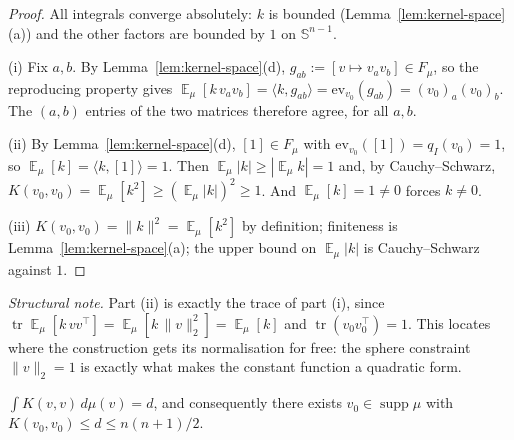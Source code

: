 \documentclass{aicr-solution}
\newcommand{\Expect}{\operatorname*{\mathbb{E}}}
\newcommand{\Sph}{\mathbb{S}^{n-1}}
\newcommand{\supp}{\operatorname{supp}}
\newcommand{\ev}{\mathrm{ev}}
\begin{document}
\begin{proof}
All integrals converge absolutely: $k$ is bounded
(Lemma~\ref{lem:kernel-space}(a)) and the other factors are bounded by
$1$ on $\Sph$.

(i) Fix $a,b$. By Lemma~\ref{lem:kernel-space}(d), $g_{ab} := [v \mapsto
v_{a}v_{b}] \in F_{\mu}$, so the reproducing property gives
$\Expect_{\mu}[k\,v_{a}v_{b}] = \langle k, g_{ab}\rangle =
\ev_{v_{0}}(g_{ab}) = (v_{0})_{a}(v_{0})_{b}$. The $(a,b)$ entries of
the two matrices therefore agree, for all $a,b$.

(ii) By Lemma~\ref{lem:kernel-space}(d), $[1] \in F_{\mu}$ with
$\ev_{v_{0}}([1]) = q_{I}(v_{0}) = 1$, so $\Expect_{\mu}[k] = \langle
k,[1]\rangle = 1$. Then $\Expect_{\mu}|k| \ge |\Expect_{\mu}k| = 1$
and, by Cauchy--Schwarz, $K(v_{0},v_{0}) = \Expect_{\mu}[k^{2}] \ge
(\Expect_{\mu}|k|)^{2} \ge 1$. And $\Expect_{\mu}[k] = 1 \ne 0$ forces
$k \ne 0$.

(iii) $K(v_{0},v_{0}) = \|k\|^{2} = \Expect_{\mu}[k^{2}]$ by
definition; finiteness is Lemma~\ref{lem:kernel-space}(a); the upper
bound on $\Expect_{\mu}|k|$ is Cauchy--Schwarz against $1$.
\end{proof}

\smallskip
\noindent\emph{Structural note.} Part (ii) is exactly the trace of
part (i), since $\operatorname{tr}\Expect_{\mu}[k\,vv^{\top}] =
\Expect_{\mu}[k\,\|v\|_{2}^{2}] = \Expect_{\mu}[k]$ and
$\operatorname{tr}(v_{0}v_{0}^{\top}) = 1$. This locates where the
construction gets its normalisation for free: the sphere constraint
$\|v\|_{2} = 1$ is exactly what makes the constant function a
quadratic form.

\begin{lemma}\label{lem:cheap-point}
$\int K(v,v)\,d\mu(v) = d$, and consequently there exists $v_{0} \in
\supp\mu$ with $K(v_{0},v_{0}) \le d \le n(n+1)/2$.
\end{lemma}
\end{document}
